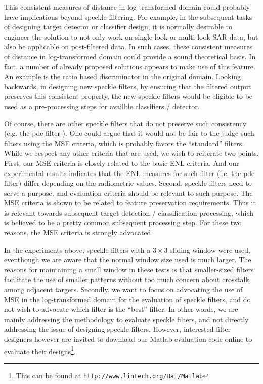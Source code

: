 \documentclass[journal]{IEEEtran}
\begin{document}
This consistent measures of distance in log-transformed domain could probably have implications beyond speckle filtering.
For example, in the subsequent tasks of designing target detector or classifier design, 
	it is normally desirable to engineer the solution to not only work on single-look or multi-look SAR data,
	but also be applicable on post-filtered data.
In such cases, these consistent measures of distance in log-transformed domain could provide a sound theoretical basis.
In fact, a number of already proposed solutions appears to make use of this feature. 
An example is the ratio based discriminator in the original domain.
Looking backwards, in designing new speckle filters, by ensuring that the filtered output preserves this consistent property,
	the new speckle filters would be eligible to be used as a pre-processing steps for availble classifiers / detector.

Of course, there are other speckle filters that do not preserve such consistency (e.g. the pde filter \cite{You_TIP_2000}).
One could argue that it would not be fair to the judge such filters using the MSE criteria, 
	which is probably favors the ``standard'' filters.
While we respect any other criteria that are used, we wish to reiterate two points.
First, our MSE criteria is closely related to the basic ENL criteria.
And our experimental results indicates that the ENL measures for such filter (i.e. the pde filter) differ depending on the radiometric values.
Second, speckle filters need to serve a purpose, and evaluation criteria should be relevant to such purpose.
The MSE criteria is shown to be related to feature preservation requirements.
Thus it is relevant towards subsequent target detection / classification processing, 
	which is believed to be a pretty common subsequent processing step.
For these two reasons, the MSE criteria is strongly advocated.

In the experiments above, speckle filters with a $3 \times 3$ sliding window were used, 
	eventhough we are aware that the normal window size used is much larger. 
The reasons for maintaining a small window in these tests is that 
	smaller-sized filters facilitate the use of smaller patterns without too much concern about crosstalk among adjacent targets.
Secondly, we want to focus on advocating the use of MSE in the log-transformed domain for the evaluation of speckle filters, 
	and do not wish to advocate which filter is the ``best'' filter. 
In other words, we are mainly addressing the methodology to evaluate speckle filters, 
	and not directly addressing the issue of designing speckle filters.
However, interested filter designers however are invited to download our Matlab evaluation code online to evaluate their designs\footnote{This can be found at \texttt{http://www.lintech.org/Hai/Matlab}}.
\end{document}
